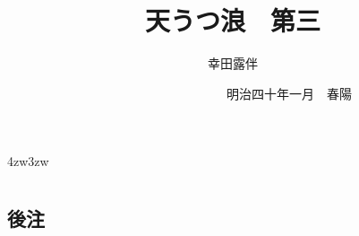\documentclass[
uplatex                                     ,%
dvipdfmx                                    ,%
book                                        ,%
tate                                        ,%
twoside                                     ,%
paper                       = a5paper       ,%
open_bracket_pos            = nibu_tentsuki ,%
hanging_punctuation                         ,%
openany                                     ,%
jafontsize                  = 12pt          ,%
]{jlreq}
\title{\Huge 天うつ浪　{\Large 第三}}
\author{幸田露伴}
\date{　　　　　　　　　{\small 明治四十年一月}　春陽{\換字{堂}}}
\begin{document}
\maketitle
\pagestyle{myheadings}
\newcommand{\Entry}[1]{
	\section*{#1}
	\markboth{#1}{#1}
	\setcounter{equation}{0}}
\begin{indentation}{4zw}{3zw}
\parindent=0pt

\chapter*{}



















































\end{indentation}

\section*{後注}
\theendnotes
\end{document}

